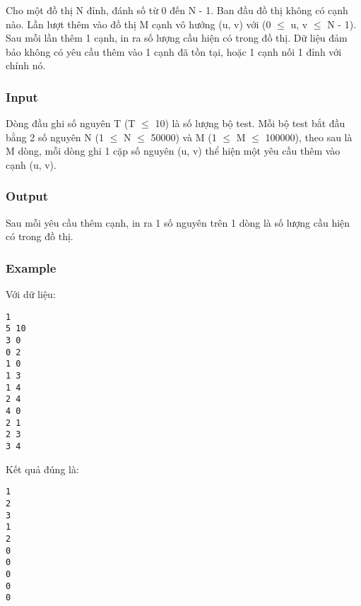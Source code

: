 







   Cho một đồ thị N đỉnh, đánh số từ 0 đến N - 1. Ban đầu đồ thị không có cạnh nào. Lần lượt thêm vào đồ thị M cạnh vô hướng (u, v) với (0  $\le$  u, v  $\le$  N - 1). Sau mỗi lần thêm 1 cạnh, in ra số lượng cầu hiện có trong đồ thị. Dữ liệu đảm bảo không có yêu cầu thêm vào 1 cạnh đã tồn tại, hoặc 1 cạnh nối 1 đỉnh với chính nó.  

\subsubsection{   Input  }

   Dòng đầu ghi số nguyên T (T  $\le$  10) là số lượng bộ test. Mỗi bộ test bắt đầu bằng 2 số nguyên N (1  $\le$  N  $\le$  50000) và M (1  $\le$  M  $\le$  100000), theo sau là M dòng, mỗi dòng ghi 1 cặp số nguyên (u, v) thể hiện một yêu cầu thêm vào cạnh (u, v).  

\subsubsection{   Output  }

   Sau mỗi yêu cầu thêm cạnh, in ra 1 số nguyên trên 1 dòng là số lượng cầu hiện có trong đồ thị.  

\subsubsection{   Example  }

   Với dữ liệu:  
\begin{verbatim}
1
5 10
3 0
0 2
1 0
1 3
1 4
2 4
4 0
2 1
2 3
3 4
\end{verbatim}

   Kết quả đúng là:  
\begin{verbatim}
1
2
3
1
2
0
0
0
0
0
\end{verbatim}

